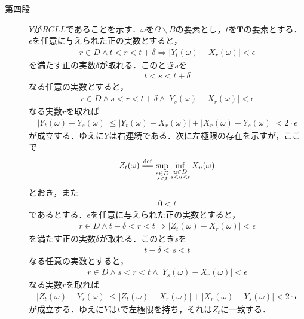 \begin{sketch}
\begin{description}
			\item[第四段]
				$Y$が$RCLL$であることを示す．$\omega$を$\Omega \backslash B$の要素とし，$t$を$\mathbf{T}$の要素とする．
				$\epsilon$を任意に与えられた正の実数とすると，
				\begin{align}
					r \in D \wedge t < r < t + \delta \Longrightarrow
					\left|Y_t(\omega) - X_r(\omega)\right| < \epsilon
				\end{align}
				を満たす正の実数$\delta$が取れる．このとき$s$を
				\begin{align}
					t < s < t+\delta
				\end{align}
				なる任意の実数とすると，
				\begin{align}
					r \in D \wedge s < r < t + \delta \wedge \left|Y_s(\omega) - X_r(\omega)\right| < \epsilon
				\end{align}
				なる実数$r$を取れば
				\begin{align}
					\left|Y_t(\omega) - Y_s(\omega)\right|
					\leq \left|Y_t(\omega) - X_r(\omega)\right| + \left|X_r(\omega) - Y_s(\omega)\right|
					< 2 \cdot \epsilon
				\end{align}
				が成立する．ゆえに$Y$は右連続である．次に左極限の存在を示すが，ここで
				\begin{align}
					Z_t(\omega) \defeq \sup{\substack{s \in D \\ s < t}}{\inf{\substack{u \in D \\ s < u < t}}{X_u(\omega)}} 
				\end{align}
				とおき，また
				\begin{align}
					0 < t
				\end{align}
				であるとする．$\epsilon$を任意に与えられた正の実数とすると，
				\begin{align}
					r \in D \wedge t - \delta < r < t \Longrightarrow
					\left|Z_t(\omega) - X_r(\omega)\right| < \epsilon
				\end{align}
				を満たす正の実数$\delta$が取れる．このとき$s$を
				\begin{align}
					t - \delta < s < t
				\end{align}
				なる任意の実数とすると，
				\begin{align}
					r \in D \wedge s < r < t \wedge \left|Y_s(\omega) - X_r(\omega)\right| < \epsilon
				\end{align}
				なる実数$r$を取れば
				\begin{align}
					\left|Z_t(\omega) - Y_s(\omega)\right|
					\leq \left|Z_t(\omega) - X_r(\omega)\right| + \left|X_r(\omega) - Y_s(\omega)\right|
					< 2 \cdot \epsilon
				\end{align}
				が成立する．ゆえに$Y$は$t$で左極限を持ち，それは$Z_t$に一致する．
				

\end{description}
\end{sketch}
